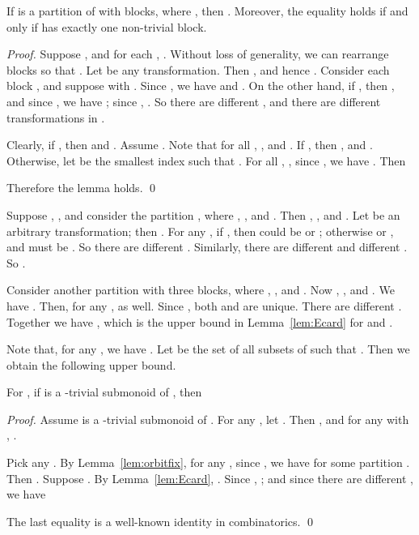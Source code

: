 \documentclass{llncs}
\newcommand{\qedb}{\hfill}
\begin{document}
\begin{lemma}\label{lem:Ecard} 
If  is a partition of  with  blocks, where , then . Moreover, the equality holds if and only if  has exactly one non-trivial block.
\end{lemma}

\begin{proof}
Suppose , and  for each , . Without loss of generality, we can rearrange blocks  so that . Let  be any transformation. Then , and hence . Consider each block , and suppose  with . Since , we have  and . On the other hand, if , then , and since , we have ; since , . So there are  different , and there are  different transformations  in . 

Clearly, if , then  and . Assume . Note that  for all , , and . If , then , and . Otherwise, let  be the smallest index such that . For all , , since , we have . Then

Therefore the lemma holds. \qed
\end{proof}

\begin{example}\label{ex:Ecard}
Suppose , , and consider the partition , where , , and . Then , , and . Let  be an arbitrary transformation; then . For any , if , then  could be  or ; otherwise  or , and  must be . So there are  different . Similarly, there are  different  and  different . So . 

Consider another partition  with three blocks, where , , and . Now , , and . We have . Then, for any ,  as well. Since , both  and  are unique. There are  different . Together we have , which is the upper bound in Lemma~\ref{lem:Ecard} for  and . \qedb
\end{example}

Note that, for any , we have . Let  be the set of all subsets  of  such that . Then we obtain the following upper bound. 

\begin{proposition}\label{prop:Jbound} 
For , if  is a -trivial submonoid of , then  
\end{proposition}


\begin{proof} 
Assume  is a -trivial submonoid of . For any , let . Then , and for any  with , . 


Pick any . By Lemma~\ref{lem:orbitfix}, for any , since , we have  for some partition . Then . Suppose . By Lemma~\ref{lem:Ecard}, . Since , ; and since there are  different , we have 
 
The last equality is a well-known  identity in combinatorics. \qed
\end{proof}
\end{document}
